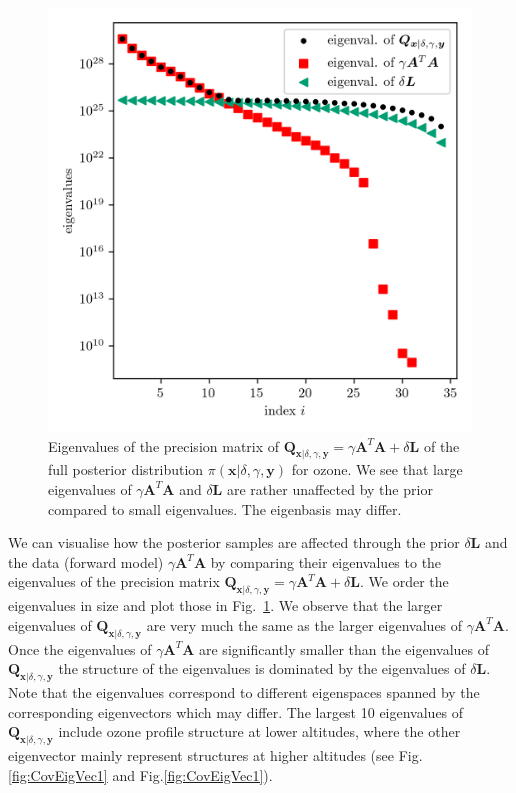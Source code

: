 \begin{figure}[ht!]
	\centering
	\includegraphics{CovSing.png}
	\caption[Eigenvalues of the posterior precision matrix]{Eigenvalues of the precision matrix of $\bm{Q}_{ \bm{x}|\delta, \gamma, \bm{y}}= \gamma \bm{A}^T \bm{A} + \delta \bm{L}$ of the full posterior distribution $\pi(\bm{x}|\delta, \gamma, \bm{y})$ for ozone.
	We see that large eigenvalues of $\gamma \bm{A}^T \bm{A}$ and $ \delta \bm{L}$ are rather unaffected by the prior compared to small eigenvalues.
The eigenbasis may differ.}
	\label{fig:PostCov}
\end{figure}
We can visualise how the posterior samples are affected through the prior $\delta \bm{L}$ and the data (forward model) $\gamma \bm{A}^T \bm{A}$ by comparing their eigenvalues to the eigenvalues of the precision matrix $\bm{Q}_{ \bm{x}|\delta, \gamma,\bm{y}}=  \gamma \bm{A}^T \bm{A} + \delta \bm{L} $.
We order the eigenvalues in size and plot those in Fig.~\ref{fig:PostCov}.
We observe that the larger eigenvalues of $\bm{Q}_{ \bm{x}|\delta, \gamma,\bm{y}}$ are very much the same as the larger eigenvalues of $\gamma \bm{A}^T \bm{A}$.
Once the eigenvalues of $\gamma \bm{A}^T \bm{A}$ are significantly smaller than the eigenvalues of $\bm{Q}_{ \bm{x}|\delta, \gamma,\bm{y}}$ the structure of the eigenvalues is dominated by the eigenvalues of $\delta \bm{L}$.
Note that the eigenvalues correspond to different eigenspaces spanned by the corresponding eigenvectors which may differ.
The largest 10 eigenvalues of $\bm{Q}_{ \bm{x}|\delta, \gamma,\bm{y}}$ include ozone profile structure at lower altitudes, where the other eigenvector mainly represent structures at higher altitudes (see Fig. \ref{fig:CovEigVec1} and Fig.\ref{fig:CovEigVec1}).


